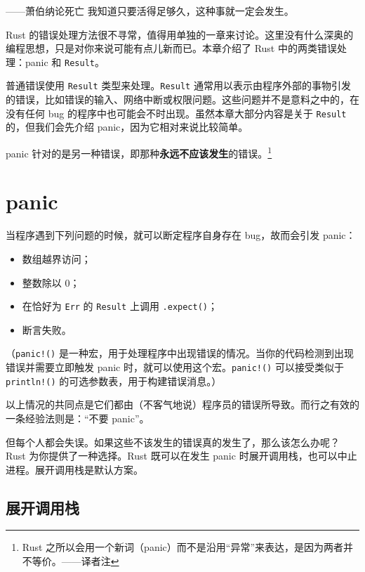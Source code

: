 
\begin{myEpigraph}{——萧伯纳论死亡}
我知道只要活得足够久，这种事就一定会发生。
\end{myEpigraph}

Rust 的错误处理方法很不寻常，值得用单独的一章来讨论。这里没有什么深奥的编程思想，只是对你来说可能有点儿新而已。本章介绍了 Rust 中的两类错误处理：panic 和 \texttt{Result}。

普通错误使用 \texttt{Result} 类型来处理。\texttt{Result} 通常用以表示由程序外部的事物引发的错误，比如错误的输入、网络中断或权限问题。这些问题并不是意料之中的，在没有任何 bug 的程序中也可能会不时出现。虽然本章大部分内容是关于 \texttt{Result} 的，但我们会先介绍 panic，因为它相对来说比较简单。

panic 针对的是另一种错误，即那种\textbf{永远不应该发生}的错误。\footnote{Rust 之所以会用一个新词（panic）而不是沿用“异常”来表达，是因为两者并不等价。——译者注}

\section{panic}

当程序遇到下列问题的时候，就可以断定程序自身存在 bug，故而会引发 panic：

\begin{itemize}
\item 数组越界访问；
\item 整数除以 0；
\item 在恰好为 \texttt{Err} 的 \texttt{Result} 上调用 \texttt{.expect()}；
\item 断言失败。
\end{itemize}

（\texttt{panic!()} 是一种宏，用于处理程序中出现错误的情况。当你的代码检测到出现错误并需要立即触发 panic 时，就可以使用这个宏。\texttt{panic!()} 可以接受类似于 \texttt{println!()} 的可选参数表，用于构建错误消息。）

以上情况的共同点是它们都由（不客气地说）程序员的错误所导致。而行之有效的一条经验法则是：“不要 panic”。

但每个人都会失误。如果这些不该发生的错误真的发生了，那么该怎么办呢？Rust 为你提供了一种选择。Rust 既可以在发生 panic 时展开调用栈，也可以中止进程。展开调用栈是默认方案。

\subsection{展开调用栈}


